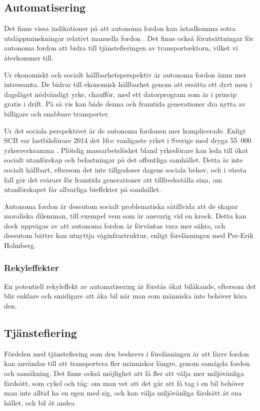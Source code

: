 \documentclass{article}
\begin{document}
\subsection{Automatisering}

Det finns vissa indikationer på att autonoma fordon kan åstadkomma sotra utsläppminskningar relativt manuella fordon . Det finns också förutsättningar för autonoma fordon att bidra till tjänstefieringen av transportsektorn, vilket vi återkommer till.

Ur ekonomiskt och socialt hållbarhetsperspektiv är autonoma fordon ännu mer intressanta. De bidrar till ekonomisk hållbarhet genom att ersätta ett dyrt men i dagsläget nödvändigt yrke, chaufför, med ett datorprogram som är i princip gratis i drift. På så vis kan både denna och framtida generationer dra nytta av billigare och snabbare transporter.

Ur det sociala perspektivet är de autonoma fordonen mer komplicerade. Enligt SCB var lastbilsförare 2014 det 16:e vanligaste yrket i Sverige med dryga 55\ 000 yrkesverksamma . Plötslig massarbetslöshet bland yrkesförare kan leda till ökat socialt utanförskap och belastningar på det offentliga samhället. Detta är inte socialt hållbart, eftersom det inte tillgodoser dagens sociala behov, och i värsta fall gör det svårare för framtida generationer att tillfredsställa sina, om utanförskapet får allvarliga bieffekter på samhället.

Autonoma fordon är dessutom socialt problematiska såtillvida att de skapar moraliska dilemman, till exempel vem som är ansvarig vid en krock. Detta kan dock uppvägas av att autonoma fordon är förväntas vara mer säkra, och dessutom bättre kan utnyttja väginfrastruktur, enligt föreläsningen med Per-Erik Holmberg.

\subsubsection{Rekyleffekter}

En potentiell rekyleffekt av automatisering är förstås ökat bilåkande, eftersom det blir enklare och smidigare att åka bil när man som människa inte behöver köra den.

\subsection{Tjänstefiering}

Fördelen med tjänstefiering som den beskrevs i föreläsningen är att färre fordon kan användas till att transportera fler människor längre, genom samägda fordon och samåkning. Det finns också möjlighet att få fler att välja mer miljövänliga färdsätt, som cykel och tåg: om man vet att det går att få tag i en bil behöver man inte alltid ha en egen med sig, och kan välja miljövänliga färdsätt åt ena hållet, och bil åt andra. 
\end{document}
